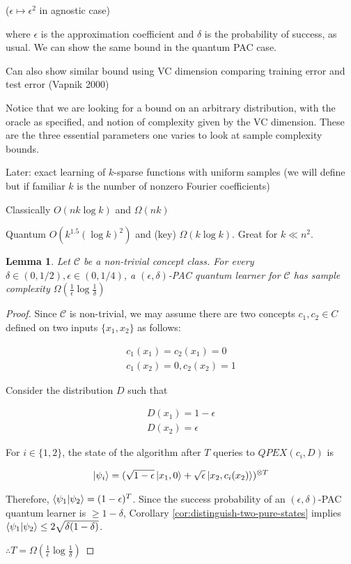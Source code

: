 \documentclass[12]{amsart}
\newcommand\0{\mathbf{0}}
\newcommand\<{\langle}
\renewcommand\>{\rangle}
\newtheorem{lemma}[theorem]{Lemma}
\begin{document}
($\epsilon \mapsto \epsilon^2$ in agnostic case)

where $\epsilon$ is the approximation coefficient and $\delta$ is the probability of success, as usual. We can show the same bound in the quantum PAC case.

Can also show similar bound using VC dimension comparing training error and test error (Vapnik 2000)

Notice that we are looking for a bound on an arbitrary distribution, with the oracle as specified, and notion of complexity given by the VC dimension. These are the three essential parameters one varies to look at sample complexity bounds.

Later: exact learning of $k$-sparse functions with uniform samples (we will define but if familiar $k$ is the number of nonzero Fourier coefficients)

Classically $O(nk \log k )$ and $\Omega(nk)$

Quantum $O(k^{1.5}(\log k)^2)$ and (key) $\Omega(k \log k )$. Great for $k \ll n^2$.

\begin{lemma}
\label{lem:vc-indep-pac}
Let $\mathcal{C}$ be a non-trivial concept class. For every $\delta \in (0,1/2), \epsilon \in (0,1/4)$, a $(\epsilon,\delta)$-PAC quantum learner for $\mathcal{C}$ has sample complexity $\Omega(\frac{1}{\epsilon}\log \frac{1}{\delta})$
\end{lemma}

\begin{proof} 
Since $\mathcal{C}$ is non-trivial, we may assume there are two concepts $c_1,c_2 \in C$ defined on two inputs $\{x_1,x_2\}$ as follows:

\begin{align*}
 c_1(x_1) = c_2(x_1) = 0\\
 c_1(x_2) = 0,c_2(x_2) = 1
\end{align*}

Consider the distribution $D$ such that

\begin{align*}
D(x_1) = 1-\epsilon\\
D(x_2) = \epsilon
\end{align*}
 
For $i \in \{1,2\}$, the state of the algorithm after $T$ queries to $QPEX(c_i,D)$ is
 
\begin{align*}
 \ket{\psi_i} = (\sqrt{1-\epsilon}\ket{x_1, 0} + \sqrt{\epsilon}\ket{x_2, c_i(x_2)})^{\otimes T}
\end{align*}
 
 Therefore, $\bra{\psi_1}\ket{\psi_2} = (1-\epsilon)^T$. Since the success probability of an $(\epsilon, \delta)$-PAC quantum learner is $\geq 1 - \delta$, Corollary \ref{cor:distinguish-two-pure-states} implies $\bra{\psi_1}\ket{\psi_2} \leq 2\sqrt{\delta(1-\delta)}$. 
 
 $\therefore T = \Omega(\frac{1}{\epsilon}\log \frac{1}{\delta})$
\end{proof}
\end{document}
